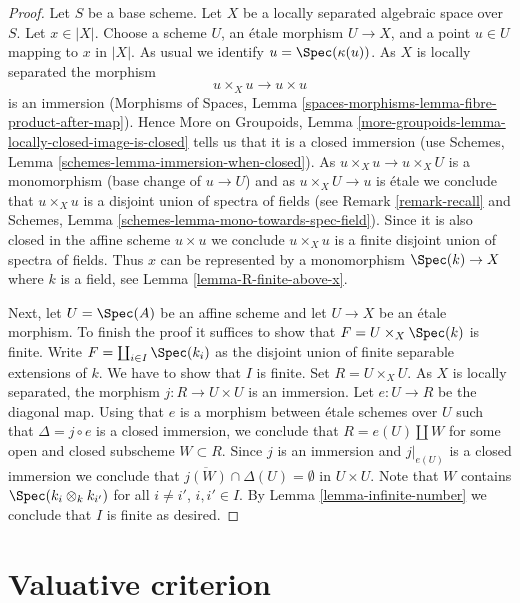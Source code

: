 \begin{proof}
Let $S$ be a base scheme. Let $X$ be a locally separated algebraic space
over $S$. Let $x \in |X|$. Choose a scheme $U$, an \'etale
morphism $U \to X$, and a point $u \in U$ mapping to $x$ in $|X|$.
As usual we identify $u = \Spec(\kappa(u))$.
As $X$ is locally separated the morphism
$$
u \times_X u \to u \times u
$$
is an immersion (Morphisms of Spaces, Lemma
\ref{spaces-morphisms-lemma-fibre-product-after-map}).
Hence More on Groupoids, Lemma
\ref{more-groupoids-lemma-locally-closed-image-is-closed}
tells us that it is a closed immersion (use
Schemes, Lemma \ref{schemes-lemma-immersion-when-closed}).
As $u \times_X u \to u \times_X U$ is a monomorphism (base change
of $u \to U$) and as $u \times_X U \to u$ is \'etale we conclude that
$u \times_X u$ is a disjoint union of spectra of fields
(see Remark \ref{remark-recall} and
Schemes, Lemma \ref{schemes-lemma-mono-towards-spec-field}).
Since it is also closed in the affine scheme $u \times u$ we
conclude $u \times_X u$ is a finite disjoint union of spectra of fields.
Thus $x$ can be represented by a monomorphism $\Spec(k) \to X$ where $k$
is a field, see
Lemma \ref{lemma-R-finite-above-x}.

\medskip\noindent
Next, let $U = \Spec(A)$ be an affine scheme and let $U \to X$ be an
\'etale morphism. To finish the proof it suffices to show that
$F = U \times_X \Spec(k)$ is finite. Write $F = \coprod_{i \in I} \Spec(k_i)$
as the disjoint union of finite separable extensions of $k$.
We have to show that $I$ is finite.
Set $R = U \times_X U$. As $X$ is locally separated, the morphism
$j : R \to U \times U$ is an immersion. Let $e : U \to R$ be the
diagonal map. Using that $e$ is a morphism between \'etale schemes
over $U$ such that $\Delta = j \circ e$ is a closed immersion, we
conclude that $R = e(U) \coprod W$ for some open and closed subscheme
$W \subset R$. Since $j$ is an immersion and $j|_{e(U)}$ is a closed
immersion we conclude that
$\overline{j(W)} \cap \Delta(U) = \emptyset$ in $U \times U$.
Note that $W$ contains $\Spec(k_i \otimes_k k_{i'})$ for all
$i \not = i'$, $i, i' \in I$. By Lemma \ref{lemma-infinite-number}
we conclude that $I$ is finite as desired.
\end{proof}








\section{Valuative criterion}
\label{section-valuative-criterion-universally-closed}

